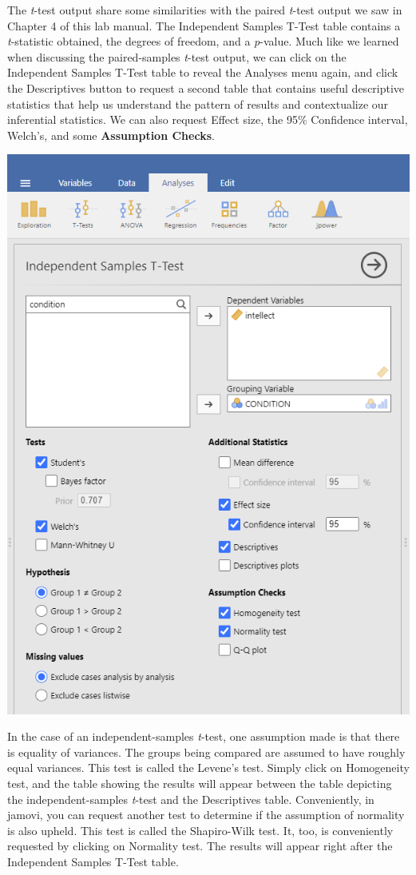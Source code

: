 \documentclass[
]{book}
\begin{document}
The \emph{t}-test output share some similarities with the paired \emph{t}-test output we saw in Chapter 4 of this lab manual. The Independent Samples T-Test table contains a \emph{t}-statistic obtained, the degrees of freedom, and a \emph{p}-value. Much like we learned when discussing the paired-samples \emph{t}-test output, we can click on the Independent Samples T-Test table to reveal the {Analyses} menu again, and click the {Descriptives} button to request a second table that contains useful descriptive statistics that help us understand the pattern of results and contextualize our inferential statistics. We can also request {Effect size}, the 95\% {Confidence interval}, {Welch's}, and some \textbf{Assumption Checks}.

\includegraphics{img/IndependTTestCommandsInFull.png}

In the case of an independent-samples \emph{t}-test, one assumption made is that there is equality of variances. The groups being compared are assumed to have roughly equal variances. This test is called the Levene's test. Simply click on {Homogeneity test}, and the table showing the results will appear between the table depicting the independent-samples \emph{t}-test and the Descriptives table. Conveniently, in jamovi, you can request another test to determine if the assumption of normality is also upheld. This test is called the Shapiro-Wilk test. It, too, is conveniently requested by clicking on {Normality test}. The results will appear right after the Independent Samples T-Test table.
\end{document}
